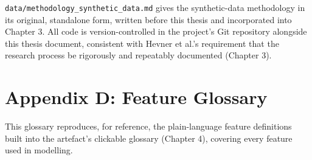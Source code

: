 \documentclass[12pt,oneside]{report}
\begin{document}
\texttt{data/methodology\_synthetic\_data.md} gives the synthetic-data
methodology in its original, standalone form, written before this thesis
and incorporated into Chapter 3. All code is version-controlled in the
project's Git repository alongside this thesis document, consistent with
Hevner et al.'s \citeyearpar{hevner2004design} requirement that the
research process be rigorously and repeatably documented (Chapter 3).

\hypertarget{appendix-d-feature-glossary}{%
\section*{Appendix D: Feature
Glossary}\label{appendix-d-feature-glossary}}

This glossary reproduces, for reference, the plain-language feature
definitions built into the artefact's clickable glossary (Chapter 4),
covering every feature used in modelling.
\end{document}
